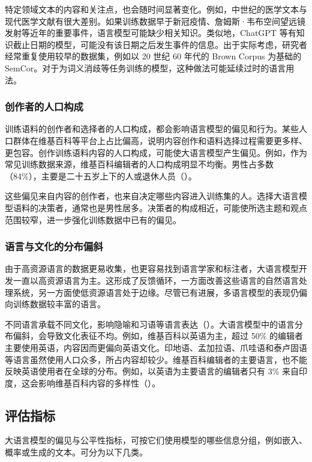 特定领域文本的内容和关注点，也会随时间显著变化。例如，中世纪的医学文本与现代医学文献有很大差别。如果训练数据早于新冠疫情、詹姆斯·韦布空间望远镜发射等近年的重要事件，语言模型可能缺少相关知识。类似地，ChatGPT 等有知识截止日期的模型，可能没有该日期之后发生事件的信息。出于实际考虑，研究者经常重复使用较早的数据集，例如以 20 世纪 60 年代的 Brown Corpus 为基础的 SemCor。对于为词义消歧等任务训练的模型，这种做法可能延续过时的语言用法。

\subsubsection{创作者的人口构成}
训练语料的创作者和选择者的人口构成，都会影响语言模型的偏见和行为。某些人口群体在维基百科等平台上占比偏高，说明内容创作和语料选择过程需要更多样、更包容。创作训练语料内容的人口构成，可能使大语言模型产生偏见。例如，作为常见训练数据来源，维基百科编辑者的人口构成明显不均衡。男性占多数（84\%），主要是二十五岁上下的人或退休人员（）。

这些偏见来自内容的创作者，也来自决定哪些内容进入训练集的人。选择大语言模型语料的决策者，通常也是男性居多。决策者的构成相近，可能使所选主题和观点范围较窄，进一步强化训练数据中已有的偏见。

\subsubsection{语言与文化的分布偏斜}
由于高资源语言的数据更易收集，也更容易找到语言学家和标注者，大语言模型开发一直以高资源语言为主。这形成了反馈循环，一方面改善这些语言的自然语言处理系统，另一方面使低资源语言处于边缘。尽管已有进展，多语言模型的表现仍偏向训练数据较丰富的语言。

不同语言承载不同文化，影响隐喻和习语等语言表达（）。大语言模型中的语言分布偏斜，会导致文化表征不均。例如，维基百科以英语为主，超过 50\% 的编辑者主要使用英语，内容因而更偏向英语文化。印地语、孟加拉语、爪哇语和泰卢固语等语言虽然使用人口众多，所占内容却较少。维基百科编辑者的主要语言，也不能反映英语使用者在全球的分布。例如，以英语为主要语言的编辑者只有 3\% 来自印度，这会影响维基百科内容的多样性（）。

\subsection{评估指标}
大语言模型的偏见与公平性指标，可按它们使用模型的哪些信息分组，例如嵌入、概率或生成的文本。可分为以下几类。

